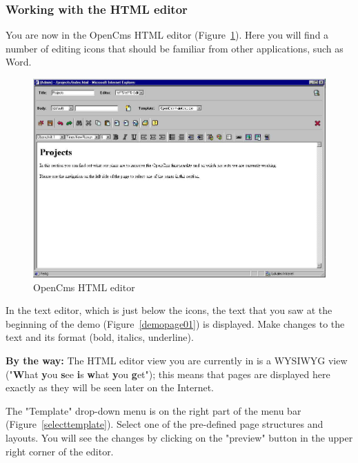 \subsubsection{Working with the HTML editor}

You are now in the OpenCms HTML editor (Figure~\ref{htmleditor}).
Here you will find a number of editing icons that should be
familiar from other applications, such as Word.

\begin{figure}[hbt]
\begin{center}
\includegraphics[width=\sgw]
                   {pics/usermanual/htmlEditor}
\caption[OpenCms HTML editor]
           {OpenCms HTML editor}
\label{htmleditor}
\end{center}
\end{figure}

In the text editor, which is just below the icons, the text that
you saw at the beginning of the demo (Figure~\ref{demopage01}) is
displayed. Make changes to the text and its format (bold, italics,
underline).

\textbf{By the way:} The HTML editor view you are currently in is
a WYSIWYG view ("\textbf{W}hat \textbf{y}ou \textbf{s}ee
\textbf{i}s \textbf{w}hat \textbf{y}ou \textbf{g}et"); this means
that pages are displayed here exactly as they will be seen later
on the Internet.

The "Template" drop-down menu is on the right part of the menu bar
(Figure~\ref{selecttemplate}). Select one of the pre-defined page
structures and layouts. You will see the changes by clicking on
the "preview" button in the upper right corner of the editor.

